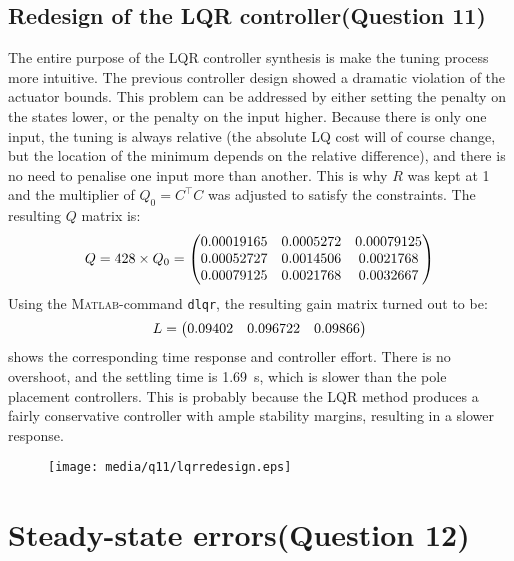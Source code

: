 \subsection{Redesign of the LQR controller\textnormal{\phantom{xxx}(Question 11)}}
\label{sec:retunelqr}
The entire purpose of the LQR controller synthesis is make the tuning process more intuitive. The previous controller design showed a dramatic violation of the actuator bounds. This problem can be addressed by either setting the penalty on the states lower, or the penalty on the input higher. Because there is only one input, the tuning is always relative (the absolute LQ cost will of course change, but the location of the minimum depends on the relative difference), and there is no need to penalise one input more than another. This is why $R$ was kept at 1 and the multiplier of $Q_0 = C^\top C$ was adjusted to satisfy the constraints. The resulting $Q$ matrix is:
$$ Q = 428\times Q_0 = \mqty(0.00019165 & 0.0005272 &  0.00079125\\
                             0.00052727 & 0.0014506 &  0.0021768\\
                             0.00079125 & 0.0021768 &  0.0032667\\) $$
Using the \textsc{Matlab}-command \texttt{dlqr}, the resulting gain matrix turned out to be:
 $$L = \mqty(0.09402 & 0.096722 & 0.09866)$$
 shows the corresponding time response and controller effort. There is no overshoot, and the settling time is \SI{1.69}{\second}, which is slower than the pole placement controllers. This is probably because the LQR method produces a fairly conservative controller with ample stability margins, resulting in a slower response.
\begin{figure}[ht]
    \centering
    \texttt{[image: media/q11/lqrredesign.eps]}
    \caption{}
    \label{fig:q11_lqrredesign}
\end{figure}

\clearpage
\section{Steady-state errors\textnormal{\phantom{xxx}(Question 12)}}
\label{sec:q12}

